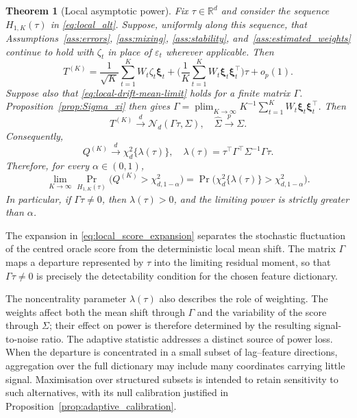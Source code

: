 \documentclass[12pt]{article}
\DeclareMathOperator*{\plim}{plim}
\newtheorem{theorem}{Theorem}[section]
\numberwithin{equation}{section}
\begin{document}
\begin{theorem}[Local asymptotic power]
\label{thm:local_power}
Fix \(\tau\in\mathbb R^d\) and consider the sequence
\(H_{1,K}(\tau)\) in \eqref{eq:local_alt}. Suppose, uniformly along this
sequence, that Assumptions~\ref{ass:errors}, \ref{ass:mixing},
\ref{ass:stability}, and~\ref{ass:estimated_weights} continue to hold with
\(\zeta_t\) in place of \(\varepsilon_t\) wherever applicable. Then
\begin{equation}
\label{eq:local_score_expansion}
T^{(K)}
=
\frac{1}{\sqrt K}\sum_{t=1}^K
W_t\zeta_t\boldsymbol{\xi}_t
+
\Big(
\frac{1}{K}\sum_{t=1}^K
W_t\boldsymbol{\xi}_t\boldsymbol{\xi}_t^\top
\Big)\tau
+
o_p(1).
\end{equation}
Suppose also that \eqref{eq:local-drift-mean-limit} holds
for a finite matrix \(\Gamma\). Proposition~\ref{prop:Sigma_xi} then gives \(\Gamma=\plim_{K\to\infty}K^{-1}\sum_{t=1}^K
W_t\boldsymbol\xi_t\boldsymbol\xi_t^\top\). Then
\begin{equation}
\label{eq:local_score_limit}
T^{(K)}
\xrightarrow{d}
\mathcal N_d(\Gamma\tau,\Sigma),\quad
\hat\Sigma\xrightarrow{p}\Sigma.
\end{equation}
Consequently,
\begin{equation}
\label{eq:local_chisq_limit}
Q^{(K)}
\xrightarrow{d}
\chi_d^2\{\lambda(\tau)\},
\quad
\lambda(\tau)
=
\tau^\top\Gamma^\top\Sigma^{-1}\Gamma\tau.
\end{equation}
Therefore, for every $\alpha\in(0,1)$,
\begin{equation}
\label{eq:local_power_curve}
\lim_{K\to\infty}
\Pr_{H_{1,K}(\tau)}
\big(
Q^{(K)}>\chi^2_{d,1-\alpha}
\big)
=
\Pr \big(
\chi_d^2\{\lambda(\tau)\}>
\chi^2_{d,1-\alpha}
\big).
\end{equation}
In particular, if \(\Gamma\tau\neq0\), then
\(\lambda(\tau)>0\), and the limiting power is strictly greater than
\(\alpha\).
\end{theorem}

The expansion in \eqref{eq:local_score_expansion} separates the stochastic
fluctuation of the centred oracle score from the deterministic local mean
shift. The matrix \(\Gamma\) maps a departure represented by \(\tau\) into
the limiting residual moment, so that $\Gamma\tau\neq 0$ is precisely the detectability condition for the chosen feature dictionary. 

The noncentrality parameter \(\lambda(\tau)\) also describes the role of weighting. The weights affect both the mean shift through \(\Gamma\) and the variability of the score through \(\Sigma\); their effect on power is therefore determined by the resulting signal-to-noise ratio. The adaptive statistic addresses a distinct source of power loss. When the departure is concentrated in a small subset of lag--feature directions, aggregation over the full dictionary may include many coordinates carrying little signal. Maximisation over structured subsets is intended to retain sensitivity to such alternatives, with its null calibration justified in Proposition~\ref{prop:adaptive_calibration}.
\end{document}
